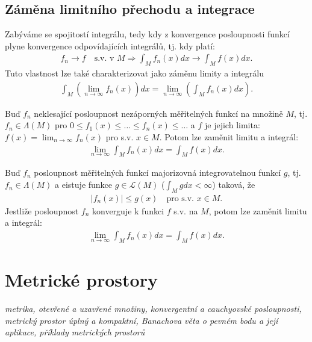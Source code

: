 \subsection{Záměna limitního přechodu a integrace}
Zabýváme se spojitostí integrálu, tedy kdy z konvergence posloupnosti funkcí plyne konvergence odpovídajících integrálů, tj. kdy platí:
\begin{align*}
f_n\rightarrow f\quad \text{s.v. v } M\Rightarrow \int_M f_n(x)dx\rightarrow\int_M f(x)dx.
\end{align*}
Tuto vlastnost lze také charakterizovat jako záměnu limity a integrálu
\begin{align*}
\int_M (\lim_{n\rightarrow\infty} f_n(x))dx=\lim_{n\rightarrow\infty}(\int_M f_n(x)dx).
\end{align*}
\begin{theorem}
Buď $f_n$ neklesající posloupnost nezáporných měřitelných funkcí na množině $M$, tj. $f_n\in \Lambda(M)$ pro $0\leq f_1(x)\leq\ldots\leq f_n(x)\leq\ldots$ a $f$ je jejich limita: $f(x)=\lim_{n\rightarrow\infty}f_n(x)$ pro s.v. $x\in M$. Potom lze zaměnit limitu a integrál:
\begin{align*}
\lim_{n\rightarrow\infty}\int_M f_n(x)dx=\int_M f(x)dx.
\end{align*}
\end{theorem}
\begin{theorem}
Buď $f_n$ posloupnost měřitelných funkcí majorizovná integrovatelnou funkcí $g$, tj. $f_n\in\Lambda(M)$ a eistuje funkce $g\in\mathscr{L}(M)$ ($\int_M g dx<\infty$) taková, že
\begin{align*}
|f_n(x)|\leq g(x)\quad\text{pro s.v. }x\in M.
\end{align*}
Jestliže posloupnost $f_n$ konverguje k funkci $f$ s.v. na $M$, potom lze zaměnit limitu a integrál:
\begin{align*}
\lim_{n\rightarrow\infty}\int_M f_n(x)dx=\int_M f(x)dx.
\end{align*}
\end{theorem}

\section{Metrické prostory}
\textit{metrika, otevřené a uzavřené množiny, konvergentní a cauchyovské posloupnosti, metrický prostor úplný a kompaktní, Banachova věta o pevném bodu a její aplikace, příklady metrických prostorů}
